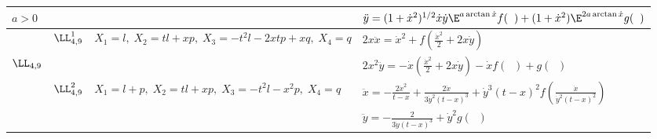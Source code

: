 \begin{landscape}
\begin{table}
\begin{center}
\begin{tabular}{|l|l|l|l|}
$ a>0$ &  &  & $\ddot y=(1+\dot x^2)^{1/2}\dot x \dot y \E^{a\arctan \dot x}
f(\;\;)+(1+\dot x^2)\E^{2a\arctan \dot x}g(\;\;)$\\
\hline
 & $\LL_{4,9}^1$ & $X_1=l,\;X_2=tl+xp,\; X_3=-t^2l-2xtp+xq,\;X_4=q$ &
$ 2x\ddot x=\dot x^2+f(\displaystyle{\frac{\dot x^2}{2}}+2x\dot y)$\\
$\LL_{4,9}$ & & & $2x^2\ddot y=-\dot x(\displaystyle{\frac{\dot x^2}{2}}+2x\dot y)
-\dot xf(\;\;)+g(\;\;)$\\
\cline{2-4}
& $\LL_{4,9}^2$ & $X_1=l+p,\;X_2=tl+xp,\;X_3=-t^2l-x^2p,\;X_4=q$ & 
$\ddot x=\displaystyle{-\frac{2\dot x^2}{t-x}+\frac{2\dot x}{3\dot y^2(t-x)^3}
+\dot y^3(t-x)^2f(\frac{\dot x}{\dot y^2(t-x)^2})}$\\
& & & $\ddot y=\displaystyle{-\frac{2}{3\dot y(t-x)^3}+\dot y^2g(\;\;)}$\\
\hline
\end{tabular}                       
\end{center}
\end{table}
\end{landscape}
%
 
